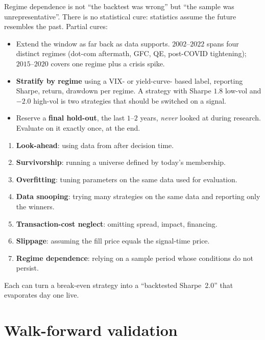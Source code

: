 Regime dependence is not ``the backtest was wrong'' but ``the sample
was unrepresentative''. There is no statistical cure: statistics
assume the future resembles the past. Partial cures:
\begin{itemize}
  \item Extend the window as far back as data supports.
  $2002$--$2022$ spans four distinct regimes (dot-com aftermath,
  GFC, QE, post-COVID tightening); $2015$--$2020$ covers one
  regime plus a crisis spike.
  \item \textbf{Stratify by regime} using a VIX- or yield-curve-
  based label, reporting Sharpe, return, drawdown per regime. A
  strategy with Sharpe $1.8$ low-vol and $-2.0$ high-vol is two
  strategies that should be switched on a signal.
  \item Reserve a \textbf{final hold-out}, the last $1$--$2$
  years, \emph{never} looked at during research. Evaluate on
  it exactly once, at the end.
\end{itemize}

\begin{pitfallbox}
\begin{enumerate}
  \item \textbf{Look-ahead}: using data from after decision
  time.
  \item \textbf{Survivorship}: running a universe defined by
  today's membership.
  \item \textbf{Overfitting}: tuning parameters on the same
  data used for evaluation.
  \item \textbf{Data snooping}: trying many strategies on the
  same data and reporting only the winners.
  \item \textbf{Transaction-cost neglect}: omitting spread,
  impact, financing.
  \item \textbf{Slippage}: assuming the fill price equals the
  signal-time price.
  \item \textbf{Regime dependence}: relying on a sample
  period whose conditions do not persist.
\end{enumerate}
Each can turn a break-even strategy into a ``backtested
Sharpe~$2.0$'' that evaporates day one live.
\end{pitfallbox}

\section{Walk-forward validation}
\label{sec:bt_walkforward}

